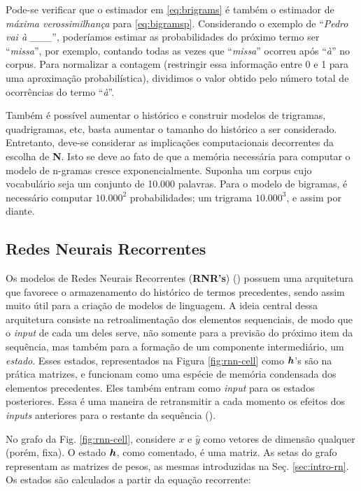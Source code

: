 Pode-se verificar que o estimador em \ref{eq:brigrams} é também o estimador de \textit{máxima verossimilhança} para \ref{eq:bigramsp}.
Considerando o exemplo de “\textit{Pedro vai à \_\_\_}”, poderíamos estimar as probabilidades do próximo termo ser “\textit{missa}”, por exemplo, contando todas as vezes que “\textit{missa}” ocorreu após “\textit{à}” no corpus. Para normalizar a contagem (restringir essa informação entre 0 e 1 para uma aproximação probabilística), dividimos o valor obtido pelo número total de ocorrências do termo “\textit{à}”.

Também é possível aumentar o histórico e construir modelos de trigramas, quadrigramas, etc, basta aumentar o tamanho do histórico a ser considerado. Entretanto, deve-se considerar as implicações computacionais decorrentes da escolha de \textbf{N}. Isto se deve ao fato de que a memória necessária para computar o modelo de n-gramas cresce exponencialmente. Suponha um corpus cujo vocabulário seja um conjunto de 10.000 palavras. Para o modelo de bigramas, é necessário computar $10.000^{2}$ probabilidades; um trigrama $10.000^{3}$, e assim por diante.


\subsection{Redes Neurais Recorrentes}
\label{sec:RNN}

Os modelos de Redes Neurais Recorrentes (\textbf{RNR's}) (\cite{Goodfellow-et-al-2016}) possuem uma arquitetura que favorece o armazenamento do histórico de termos precedentes, sendo assim muito útil para a criação de modelos de linguagem. A ideia central dessa arquitetura consiste na retroalimentação dos elementos sequenciais, de modo que o \textit{input} de cada um deles serve, não somente para a previsão do próximo item da sequência, mas também para a formação de um componente intermediário, um \textit{estado}. Esses estados, representados na Figura \ref{fig:rnn-cell} como $\bm{h}$'s são na prática matrizes, e funcionam como uma espécie de memória condensada dos elementos precedentes. Eles também entram como \textit{input }para os estados posteriores. Essa é uma maneira de retransmitir a cada momento os efeitos dos \textit{inputs} anteriores para o restante da sequência (\cite{Goodfellow-et-al-2016}). 



No grafo da Fig. \ref{fig:rnn-cell}, considere $x$ e $\hat{y}$ como vetores de dimensão qualquer (porém, fixa). O estado $\bm{h}$, como comentado, é uma matriz. As setas do grafo representam as matrizes de pesos, as mesmas introduzidas na Seç. \ref{sec:intro-rn}.
Os estados são calculados a partir da equação recorrente:

